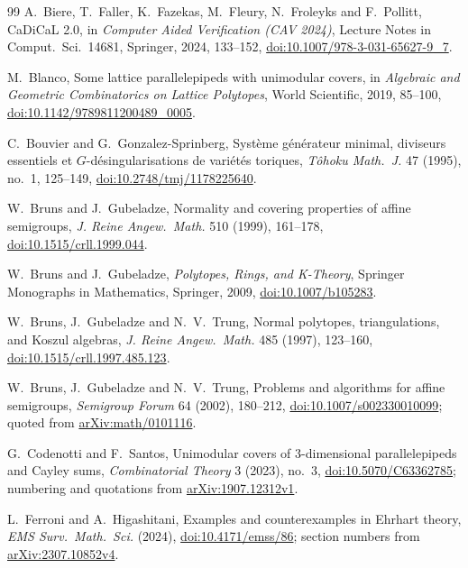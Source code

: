 \documentclass[11pt]{article}
\theoremstyle{definition}
\begin{document}
\begin{thebibliography}{99}
 A.~Biere, T.~Faller, K.~Fazekas, M.~Fleury, N.~Froleyks
and F.~Pollitt, CaDiCaL 2.0, in \emph{Computer Aided Verification (CAV
2024)}, Lecture Notes in Comput.\ Sci.\ 14681, Springer, 2024, 133--152,
\href{https://doi.org/10.1007/978-3-031-65627-9_7}{doi:10.1007/978-3-031-65627-9\_7}.

 M.~Blanco, Some lattice parallelepipeds with unimodular covers,
in \emph{Algebraic and Geometric Combinatorics on Lattice Polytopes}, World
Scientific, 2019, 85--100,
\href{https://doi.org/10.1142/9789811200489_0005}{doi:10.1142/9789811200489\_0005}.

 C.~Bouvier and G.~Gonzalez-Sprinberg, Système générateur
minimal, diviseurs essentiels et $G$-désingularisations de variétés
toriques, \emph{Tôhoku Math.\ J.} 47 (1995), no.~1, 125--149,
\href{https://doi.org/10.2748/tmj/1178225640}{doi:10.2748/tmj/1178225640}.

 W.~Bruns and J.~Gubeladze, Normality and covering properties of
affine semigroups, \emph{J. Reine Angew.\ Math.} 510 (1999), 161--178,
\href{https://doi.org/10.1515/crll.1999.044}{doi:10.1515/crll.1999.044}.

 W.~Bruns and J.~Gubeladze, \emph{Polytopes, Rings, and
K-Theory}, Springer Monographs in Mathematics, Springer, 2009,
\href{https://doi.org/10.1007/b105283}{doi:10.1007/b105283}.

 W.~Bruns, J.~Gubeladze and N.~V.~Trung, Normal polytopes,
triangulations, and Koszul algebras, \emph{J. Reine Angew.\ Math.} 485
(1997), 123--160,
\href{https://doi.org/10.1515/crll.1997.485.123}{doi:10.1515/crll.1997.485.123}.

 W.~Bruns, J.~Gubeladze and N.~V.~Trung, Problems and
algorithms for affine semigroups, \emph{Semigroup Forum} 64 (2002),
180--212,
\href{https://doi.org/10.1007/s002330010099}{doi:10.1007/s002330010099};
quoted from \href{https://arxiv.org/abs/math/0101116}{arXiv:math/0101116}.

 G.~Codenotti and F.~Santos, Unimodular covers of
$3$-dimensional parallelepipeds and Cayley sums, \emph{Combinatorial
Theory} 3 (2023), no.~3,
\href{https://doi.org/10.5070/C63362785}{doi:10.5070/C63362785}; numbering
and quotations from
\href{https://arxiv.org/abs/1907.12312v1}{arXiv:1907.12312v1}.

 L.~Ferroni and A.~Higashitani, Examples and counterexamples in
Ehrhart theory, \emph{EMS Surv.\ Math.\ Sci.} (2024),
\href{https://doi.org/10.4171/emss/86}{doi:10.4171/emss/86}; section
numbers from \href{https://arxiv.org/abs/2307.10852v4}{arXiv:2307.10852v4}.


\end{thebibliography}
\end{document}
